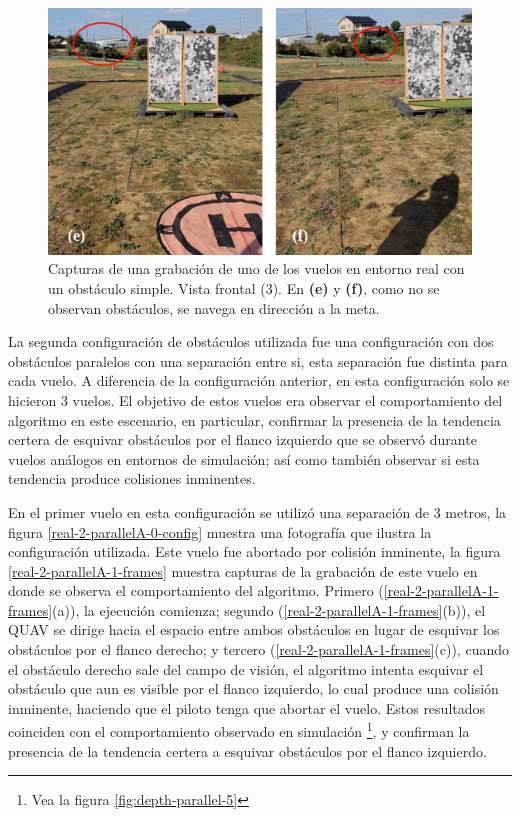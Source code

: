 \begin{figure}[H]
    \centering
    \includegraphics[scale=0.24]{partes/ImgJoao/real-1-single-4-frames-3.png}
    \caption[Capturas de una grabación de uno de los vuelos en entorno real con un obstáculo simple. Vista frontal (3).]{Capturas de una grabación de uno de los vuelos en entorno real con un obstáculo simple. Vista frontal (3). En \textbf{(e)} y \textbf{(f)}, como no se observan obstáculos, se navega en dirección a la meta.}
    \label{real-1-single-4-frames-3}
\end{figure}

La segunda configuración de obstáculos utilizada fue una configuración con dos obstáculos paralelos con una separación entre si, esta separación fue distinta para cada vuelo. A diferencia de la configuración anterior, en esta configuración solo se hicieron 3 vuelos. El objetivo de estos vuelos era observar el comportamiento del algoritmo en este escenario, en particular, confirmar la presencia de la tendencia certera de esquivar obstáculos por el flanco izquierdo que se observó durante vuelos análogos en entornos de simulación; así como también observar si esta tendencia produce colisiones inminentes.

En el primer vuelo en esta configuración se utilizó una separación de 3 metros, la figura \ref{real-2-parallelA-0-config} muestra una fotografía que ilustra la configuración utilizada. Este vuelo fue abortado por colisión inminente, la figura \ref{real-2-parallelA-1-frames} muestra capturas de la grabación de este vuelo en donde se observa el comportamiento del algoritmo. Primero (\ref{real-2-parallelA-1-frames}(a)), la ejecución comienza; segundo (\ref{real-2-parallelA-1-frames}(b)), el QUAV se dirige hacia el espacio entre ambos obstáculos en lugar de esquivar los obstáculos por el flanco derecho; y tercero (\ref{real-2-parallelA-1-frames}(c)), cuando el obstáculo derecho sale del campo de visión, el algoritmo intenta esquivar el obstáculo que aun es visible por el flanco izquierdo, lo cual produce una colisión inminente, haciendo que el piloto tenga que abortar el vuelo. Estos resultados coinciden con el comportamiento observado en simulación \footnote{Vea la figura \ref{fig:depth-parallel-5}}, y confirman la presencia de la tendencia certera a esquivar obstáculos por el flanco izquierdo.

